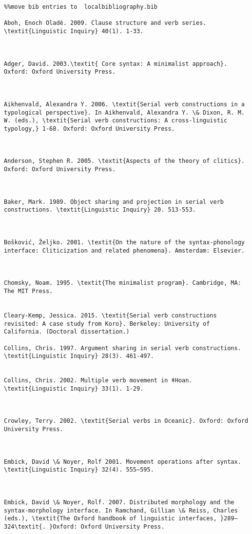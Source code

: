 \documentclass[output=paper]{langsci/langscibook}
\begin{document}
\begin{verbatim}%%move bib entries to  localbibliography.bib 

Aboh, Enoch Oladé. 2009. Clause structure and verb series. \textit{Linguistic Inquiry} 40(1). 1-33.



Adger, David. 2003.\textit{ Core syntax: A minimalist approach}. Oxford: Oxford University Press.



Aikhenvald, Alexandra Y. 2006. \textit{Serial verb constructions in a typological perspective}. In Aikhenvald, Alexandra Y. \& Dixon, R. M. W. (eds.), \textit{Serial verb constructions: A cross-linguistic typology,} 1-68. Oxford: Oxford University Press. 



Anderson, Stephen R. 2005. \textit{Aspects of the theory of clitics}. Oxford: Oxford University Press.



Baker, Mark. 1989. Object sharing and projection in serial verb constructions. \textit{Linguistic Inquiry} 20. 513-553.



Bošković, Željko. 2001. \textit{On the nature of the syntax-phonology interface: Cliticization and related phenomena}. Amsterdam: Elsevier.



Chomsky, Noam. 1995. \textit{The minimalist program}. Cambridge, MA: The MIT Press.


Cleary-Kemp, Jessica. 2015. \textit{Serial verb constructions revisited: A case study from Koro}. Berkeley: University of California. (Doctoral dissertation.) 

Collins, Chris. 1997. Argument sharing in serial verb constructions. \textit{Linguistic Inquiry} 28(3). 461-497.


Collins, Chris. 2002. Multiple verb movement in ǂHoan. \textit{Linguistic Inquiry} 33(1). 1-29.



Crowley, Terry. 2002. \textit{Serial verbs in Oceanic}. Oxford: Oxford University Press.



Embick, David \& Noyer, Rolf 2001. Movement operations after syntax. \textit{Linguistic Inquiry} 32(4). 555–595.



Embick, David \& Noyer, Rolf. 2007. Distributed morphology and the syntax-morphology interface. In Ramchand, Gillian \& Reiss, Charles (eds.), \textit{The Oxford handbook of linguistic interfaces, }289–324\textit{. }Oxford: Oxford University Press.




\end{verbatim}
\end{document}
